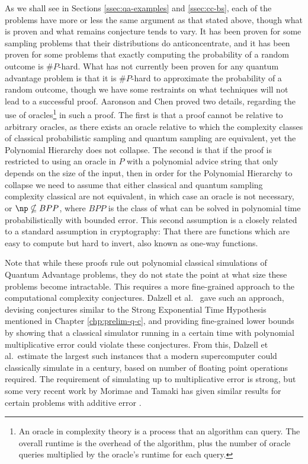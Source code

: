As we shall see in Sections \ref{ssec:qa-examples} and \ref{ssec:cc-bs}, each of the problems have more or less the same argument as that stated above, though what is proven and what remains conjecture tends to vary. It has been proven for some sampling problems that their distributions do anticoncentrate, and it has been proven for some problems that exactly computing the probability of a random outcome is $\#P$-hard. What has not currently been proven for any quantum advantage problem is that it is $\#P$-hard to approximate the probability of a random outcome, though we have some restraints on what techniques will not lead to a successful proof. Aaronson and Chen \cite{aaronson2016chen} proved two details, regarding the use of oracles\footnote{An oracle in complexity theory is a process that an algorithm can query. The overall runtime is the overhead of the algorithm, plus the number of oracle queries multiplied by the oracle's runtime for each query.} in such a proof. The first is that a proof cannot be relative to arbitrary oracles, as there exists an oracle relative to which the complexity classes of classical probabilistic sampling and quantum sampling are equivalent, yet the Polynomial Hierarchy does not collapse. The second is that if the proof is restricted to using an oracle in $P$ with a polynomial advice string that only depends on the size of the input, then in order for the Polynomial Hierarchy to collapse we need to assume that either classical and quantum sampling complexity classical are not equivalent, in which case an oracle is not necessary, or $\np \nsubseteq BPP$, where $BPP$ is the class of what can be solved in polynomial time probabilistically with bounded error. This second assumption is a closely related to a standard assumption in cryptography: That there are functions which are easy to compute but hard to invert, also known as one-way functions.

Note that while these proofs rule out polynomial classical simulations of Quantum Advantage problems, they do not state the point at what size these problems become intractable. This requires a more fine-grained approach to the computational complexity conjectures. Dalzell et al.~\cite{dalzell2017, dalzell2018} gave such an approach, devising conjectures similar to the Strong Exponential Time Hypothesis mentioned in Chapter \ref{chp:prelim-q-c}, and providing fine-grained lower bounds by showing that a classical simulator running in a certain time with polynomial multiplicative error could violate these conjectures. From this, Dalzell et al.\ estimate the largest such instances that a modern supercomputer could classically simulate in a century, based on number of floating point operations required. The requirement of simulating up to multiplicative error is strong, but some very recent work by Morimae and Tamaki has given similar results for certain problems with additive error \cite{morimae2019}.

